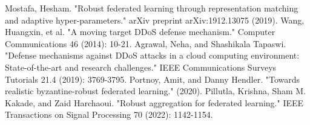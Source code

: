 \documentclass[conference]{IEEEtran}
\begin{document}
\begin{thebibliography}{00}
     Mostafa, Hesham. "Robust federated learning through representation matching and adaptive hyper-parameters." arXiv preprint arXiv:1912.13075 (2019).
     Wang, Huangxin, et al. "A moving target DDoS defense mechanism." Computer Communications 46 (2014): 10-21.
     Agrawal, Neha, and Shashikala Tapaswi. "Defense mechanisms against DDoS attacks in a cloud computing environment: State-of-the-art and research challenges." IEEE Communications Surveys  Tutorials 21.4 (2019): 3769-3795.
     Portnoy, Amit, and Danny Hendler. "Towards realistic byzantine-robust federated learning." (2020).
     Pillutla, Krishna, Sham M. Kakade, and Zaid Harchaoui. "Robust aggregation for federated learning." IEEE Transactions on Signal Processing 70 (2022): 1142-1154.




\end{thebibliography}
\end{document}
